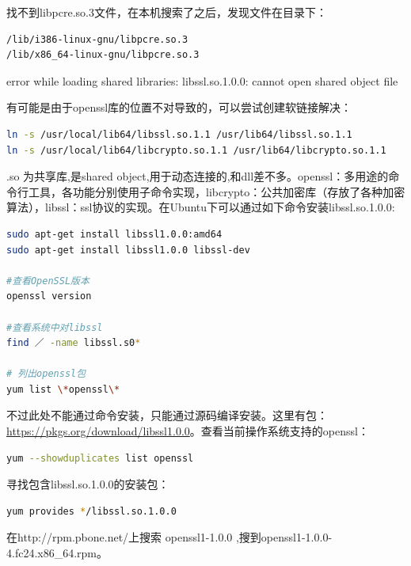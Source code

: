 \documentclass[12pt]{book}
\makeatletter
\numberwithin{dummy}{section}
\theoremstyle{ocrenumbox}
\theoremstyle{blacknumex}
\theoremstyle{blacknumbox}
\theoremstyle{ocrenum}
\renewcommand\paragraph{\@startsection{paragraph}{4}{\z@}
	{-2ex \@plus-.2ex \@minus .2ex}
	{.1ex}
	{\normalfont\small\sffamily\bfseries}}
\makeatother
\begin{document}
找不到libpcre.so.3文件，在本机搜索了之后，发现文件在目录下：

\begin{lstlisting}[language=bash]
/lib/i386-linux-gnu/libpcre.so.3
/lib/x86_64-linux-gnu/libpcre.so.3
\end{lstlisting}

\paragraph{error while loading shared libraries: libssl.so.1.0.0: cannot open shared object file}

有可能是由于openssl库的位置不对导致的，可以尝试创建软链接解决：

\begin{lstlisting}[language=bash]
ln -s /usr/local/lib64/libssl.so.1.1 /usr/lib64/libssl.so.1.1  
ln -s /usr/local/lib64/libcrypto.so.1.1 /usr/lib64/libcrypto.so.1.1  
\end{lstlisting}

.so 为共享库,是shared object,用于动态连接的,和dll差不多。openssl：多用途的命令行工具，各功能分别使用子命令实现，libcrypto：公共加密库（存放了各种加密算法），libssl：ssl协议的实现。在Ubuntu下可以通过如下命令安装libssl.so.1.0.0:

\begin{lstlisting}[language=bash]
sudo apt-get install libssl1.0.0:amd64
sudo apt-get install libssl1.0.0 libssl-dev

#查看OpenSSL版本
openssl version

#查看系统中对libssl
find ／ -name libssl.s0*

# 列出openssl包
yum list \*openssl\*
\end{lstlisting}

不过此处不能通过命令安装，只能通过源码编译安装。这里有包： \url{https://pkgs.org/download/libssl1.0.0}。查看当前操作系统支持的openssl：

\begin{lstlisting}[language=bash]
yum --showduplicates list openssl
\end{lstlisting}

寻找包含libssl.so.1.0.0的安装包：

\begin{lstlisting}[language=bash]
yum provides */libssl.so.1.0.0
\end{lstlisting}

在http://rpm.pbone.net/上搜索 openssl1-1.0.0 ,搜到openssl1-1.0.0-4.fc24.x86\_64.rpm。
\end{document}
